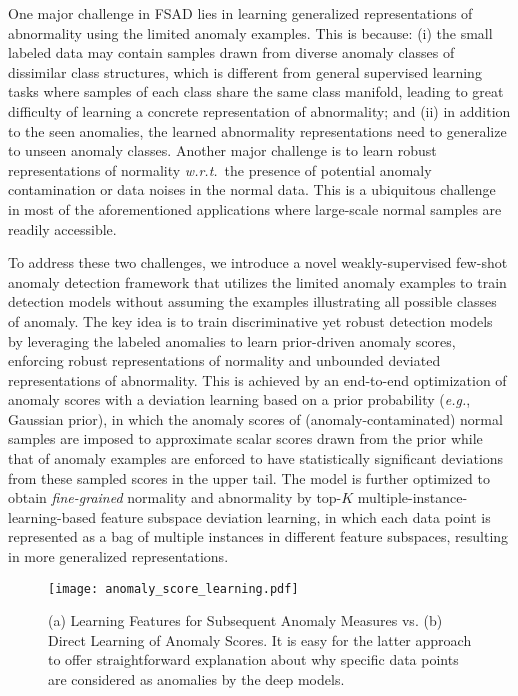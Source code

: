 \documentclass[10pt,journal,compsoc]{IEEEtran}
\newcommand{\eg}{\textit{e.g.}}
\begin{document}
One major challenge in FSAD lies in learning generalized representations of abnormality using the limited anomaly examples. This is because: (i) the small labeled data may contain samples drawn from diverse anomaly classes of dissimilar class structures, which is different from general supervised learning tasks where samples of each class share the same class manifold, leading to great difficulty of learning a concrete representation of abnormality; and (ii) in addition to the seen anomalies, the learned abnormality representations need to generalize to unseen anomaly classes. Another major challenge is to learn robust representations of normality \textit{w.r.t.}\ the presence of potential anomaly contamination or data noises in the normal data. This is a ubiquitous challenge in most of the aforementioned applications where large-scale normal samples are readily accessible.

To address these two challenges, we introduce a novel weakly-supervised few-shot anomaly detection framework that utilizes the limited anomaly examples to train detection models without assuming the examples illustrating all possible classes of anomaly. The key idea is to train discriminative yet robust detection models by leveraging the labeled anomalies to learn prior-driven anomaly scores, enforcing robust representations of normality and unbounded deviated representations of abnormality. This is achieved by an end-to-end optimization of anomaly scores with a deviation learning based on a prior probability (\eg, Gaussian prior), in which the anomaly scores of (anomaly-contaminated) normal samples are imposed to approximate scalar scores drawn from the prior while that of anomaly examples are enforced to have statistically significant deviations from these sampled scores in the upper tail. The model is further optimized to obtain \textit{fine-grained} normality and abnormality by top-$K$ multiple-instance-learning-based feature subspace deviation learning, in which each data point is represented as a bag of multiple instances in different feature subspaces, resulting in more generalized representations.

\begin{figure}[t!]
  \centering
    \texttt{[image: anomaly\_score\_learning.pdf]}
  \caption{(a) Learning Features for Subsequent Anomaly Measures
vs. (b) Direct Learning of Anomaly Scores. It is easy for the latter approach to offer straightforward explanation about why specific data points are considered as anomalies by the deep models.}
  \label{fig:anomalyscorelearning}
\end{figure}
\end{document}
